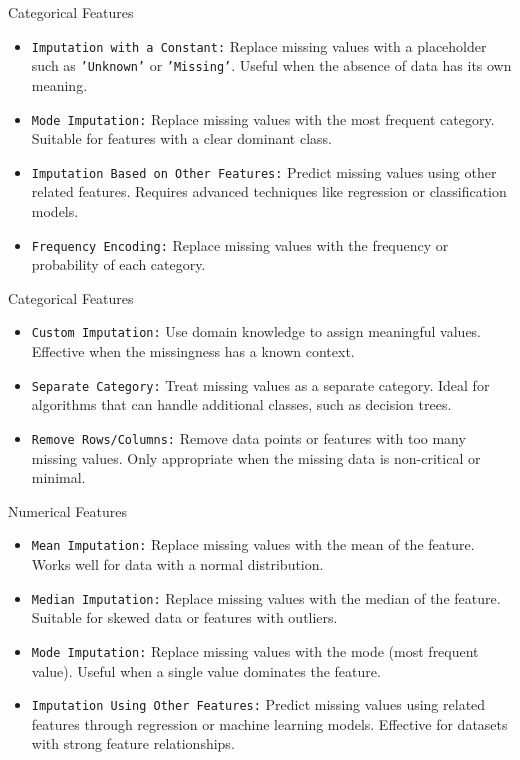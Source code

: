 \documentclass[serif, aspectratio=169]{beamer}
\begin{document}
\begin{frame}{Categorical Features}
    \begin{itemize}
        \item \texttt{\color{green}Imputation with a Constant:} Replace missing values with a placeholder such as \texttt{'Unknown'} or \texttt{'Missing'}. Useful when the absence of data has its own meaning.
        \item \texttt{\color{green}Mode Imputation:} Replace missing values with the most frequent category. Suitable for features with a clear dominant class.
        \item \texttt{\color{green}Imputation Based on Other Features:} Predict missing values using other related features. Requires advanced techniques like regression or classification models.
        \item \texttt{\color{green}Frequency Encoding:} Replace missing values with the frequency or probability of each category.
    \end{itemize}
\end{frame}

\begin{frame}{Categorical Features}
    \begin{itemize}
         \item \texttt{\color{green}Custom Imputation:} Use domain knowledge to assign meaningful values. Effective when the missingness has a known context.
         \item \texttt{\color{green}Separate Category:} Treat missing values as a separate category. Ideal for algorithms that can handle additional classes, such as decision trees.
        \item \texttt{\color{green}Remove Rows/Columns:} Remove data points or features with too many missing values. Only appropriate when the missing data is non-critical or minimal.
    \end{itemize}
\end{frame}

\begin{frame}{Numerical Features}
    \begin{itemize}
         \item \texttt{\color{blue}Mean Imputation:} Replace missing values with the mean of the feature. Works well for data with a normal distribution.
         \item \texttt{\color{blue}Median Imputation:} Replace missing values with the median of the feature. Suitable for skewed data or features with outliers.
         \item \texttt{\color{blue}Mode Imputation:} Replace missing values with the mode (most frequent value). Useful when a single value dominates the feature.
         \item \texttt{\color{blue}Imputation Using Other Features:} Predict missing values using related features through regression or machine learning models. Effective for datasets with strong feature relationships.
    \end{itemize}
\end{frame}
\end{document}
